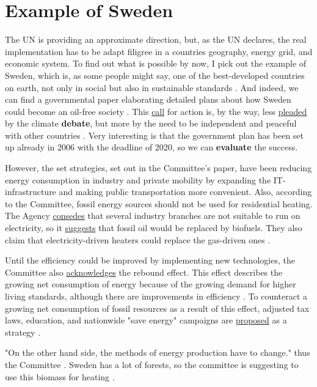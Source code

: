 \section{Example of Sweden}
\label{sec:Sweden}
The UN is providing an approximate direction, but, as the UN declares, the real implementation has to be adapt filigree in a countries 
geography, energy grid, and economic system. 
To find out what is possible by now, I pick out the example of Sweden, {\Large which is, as some people might say}, 
one of the best-developed countries on earth, not only in social but also in sustainable standards \cite{Sweden_happy}.
And indeed, we can find a governmental paper elaborating detailed plans about how Sweden could become an oil-free society \cite{Sweden}.
This \underline{call} for action is, by the way, less \underline{pleaded} by the climate \textbf{debate}, 
but more by the need to be independent and peaceful with other countries \cite[2]{Sweden}.
Very interesting is that the government plan has been set up already in 2006 with the deadline of 2020, so we can \textbf{evaluate} the success.
\par
However, the set strategies, set out in the Committee's paper, have been reducing energy consumption in industry and private mobility by expanding the IT-infrastructure and making public transportation more convenient.
Also, {\Large according to} the Committee, fossil energy sources should not be used for residential heating.
The Agency \underline{consedes} that several industry branches are not suitable to run on electricity, so it \underline{suggests} that fossil oil would be replaced by biofuels.
They also {\Large claim that} electricity-driven heaters could replace the gas-driven ones \cite[4]{Sweden}.
\par
Until the efficiency could be improved by implementing new technologies, the Committee also \underline{acknowledges} the rebound effect.
This effect describes the growing net consumption of energy because of the growing demand for higher living standards, although there are improvements in efficiency \cite[5]{Sweden}.
To counteract a growing net consumption of fossil resources as a result of this effect, adjusted tax laws, education, and nationwide "save energy" campaigns are \underline{proposed} as a strategy \cite[5]{Sweden}.
\par
"On the other hand side, the methods of energy production have to change." thus the Committee \cite[14]{Sweden}. 
Sweden has a lot of forests, so the committee is suggesting to use this biomass for heating \cite[14]{Sweden}.
